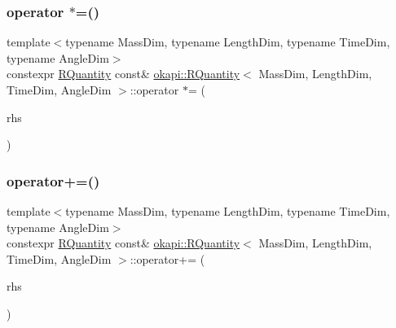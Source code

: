 \mbox{\label{classokapi_1_1RQuantity_a6b7d24bc8921f4b139f3ecaa239099a5}} 
\subsubsection{\texorpdfstring{operator $\ast$=()}{operator *=()}}
{\footnotesize\ttfamily template$<$typename Mass\+Dim, typename Length\+Dim, typename Time\+Dim, typename Angle\+Dim$>$ \\
constexpr \mbox{\hyperlink{classokapi_1_1RQuantity}{R\+Quantity}} const\& \mbox{\hyperlink{classokapi_1_1RQuantity}{okapi\+::\+R\+Quantity}}$<$ Mass\+Dim, Length\+Dim, Time\+Dim, Angle\+Dim $>$\+::operator $\ast$= (\begin{DoxyParamCaption}\item[{const double}]{rhs }\end{DoxyParamCaption})\hspace{0.3cm}{\ttfamily [inline]}}

\mbox{\label{classokapi_1_1RQuantity_a788b594f6f9050612d781357bcfe745c}} 
\subsubsection{\texorpdfstring{operator+=()}{operator+=()}}
{\footnotesize\ttfamily template$<$typename Mass\+Dim, typename Length\+Dim, typename Time\+Dim, typename Angle\+Dim$>$ \\
constexpr \mbox{\hyperlink{classokapi_1_1RQuantity}{R\+Quantity}} const\& \mbox{\hyperlink{classokapi_1_1RQuantity}{okapi\+::\+R\+Quantity}}$<$ Mass\+Dim, Length\+Dim, Time\+Dim, Angle\+Dim $>$\+::operator+= (\begin{DoxyParamCaption}\item[{const \mbox{\hyperlink{classokapi_1_1RQuantity}{R\+Quantity}}$<$ Mass\+Dim, Length\+Dim, Time\+Dim, Angle\+Dim $>$ \&}]{rhs }\end{DoxyParamCaption})\hspace{0.3cm}{\ttfamily [inline]}}

